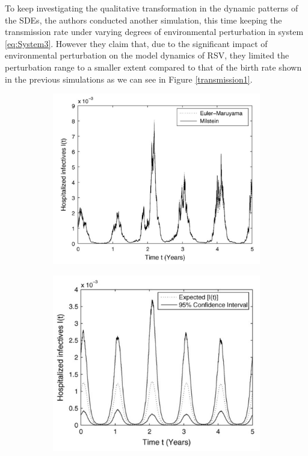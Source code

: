 To keep investigating the qualitative transformation in the dynamic patterns of the SDEs, the authors conducted another simulation, this time keeping the transmission rate under varying degrees of environmental perturbation in system \ref{eq:System3}. However they claim that, due to the significant impact of environmental perturbation on the model dynamics of RSV, they limited the perturbation range to a smaller extent compared to that of the birth rate shown in the previous simulations as we can see in Figure \ref{transmission1}.

\begin{figure}[h!]
    \centering
    \begin{subfigure}{0.4\textwidth}
        \includegraphics[width=\linewidth]{IMG/stoc_transmission_rate_perturbated.png}
        \caption{}
    \end{subfigure}
    \begin{subfigure}{0.4\textwidth}
        \includegraphics[width=\linewidth]{IMG/trasmisision_confidence1.png}

\end{subfigure}
\end{figure}
